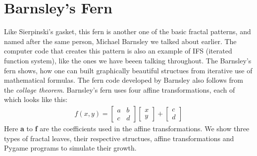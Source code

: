 \documentclass{article}
\begin{document}
\section{Barnsley's Fern}
Like Sierpinski's gasket, this fern is another one of the basic fractal patterns, and named after the same person, Michael Barnsley we talked about earlier. The computer code that creates this pattern is also an example of IFS (iterated function system), like the ones we have beeen talking throughout. The Barnsley's fern shows, how one can built graphically beautiful structues from iterative use of mathematical formulas. The fern code developed by Barnsley also follows from the \textit{collage theorem}. Barnsley's fern uses four affine transformations, each of which looks like this:
\begin{gather}
f(x, y)=\begin{bmatrix}a & b \\ c & d \end{bmatrix}\begin{bmatrix}x\\y\end{bmatrix}+\begin{bmatrix}c\\d\end{bmatrix}
\end{gather}
Here \textbf{a} to \textbf{f} are the coefficients used in the affine transformations. We show three types of fractal leaves, their respective structues, affine transformations and Pygame programs to simulate their growth.
\end{document}
